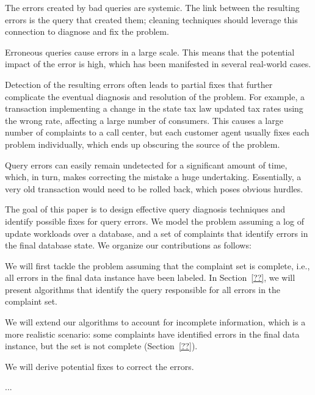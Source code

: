 \begin{description}[leftmargin=5mm, topsep=0mm, itemsep=0mm]
    \item[Systemic errors.] The errors created by bad queries are
    systemic. The link between the resulting errors is the query
    that created them; cleaning techniques should leverage this
    connection to diagnose and fix the problem.
    
    \item[Large impact.] Erroneous queries cause errors in a large
    scale. This means that the potential impact of the error is high,
    which has been manifested in several real-world
    cases.%
    
    \item[Obscurity.] Detection of the resulting errors often leads to
    partial fixes that further complicate the eventual diagnosis and
    resolution of the problem. For example, a transaction implementing
    a change in the state tax law updated tax rates using the wrong
    rate, affecting a large number of consumers. This causes a large
    number of complaints to a call center, but each customer agent
    usually fixes each problem individually, which ends up obscuring
    the source of the problem.
    
    \item[Feasibility.] Query errors can easily remain undetected
    for a significant amount of time, which, in turn, makes correcting
    the mistake a huge undertaking. Essentially, a very old
    transaction would need to be rolled back, which poses obvious
    hurdles.
\end{description}

The goal of this paper is to design effective query
diagnosis techniques and identify possible fixes for query errors. We
model the problem assuming a log of update workloads over a database,
and a set of complaints that identify errors in the final database
state. We organize our contributions as follows:

\begin{description}[leftmargin=5mm, topsep=0mm, itemsep=0mm]        
    \item[Diagnosis with complete information:] We will first tackle the
    problem assuming that the complaint set is complete, i.e., all errors in
    the final data instance have been labeled. In Section~\ref{??}, we will
    present algorithms that identify the query responsible for all errors in
    the complaint set.
    
    \item[Diagnosis with incomplete information:] We will extend our
    algorithms to account for incomplete information, which is a more
    realistic scenario: some complaints have identified errors in the
    final data instance, but the set is not complete (Section~\ref{??}).
    
    \item[Deriving fixes:] We will derive potential fixes to correct
    the errors.
    
    \item[Evaluation:]...
\end{description}



